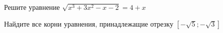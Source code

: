 \begin{ex}
	\begin{condition}
		\begin{enumcols}[label=\asbuk*)]
			\item Решите уравнение \( \sqrt{x^3 + 3x^2 - x -2}=4+x \)
			\item Найдите все корни уравнения, принадлежащие отрезку \( \left[-\sqrt{5};-\sqrt{3}\right] \)
		\end{enumcols}
	\end{condition}
\end{ex}